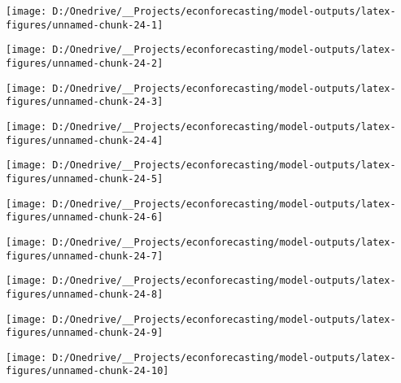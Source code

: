 \documentclass[11pt, letterpaper]{article}\usepackage[]{graphicx}\usepackage[]{color}
\begin{document}
{\centering \texttt{[image: D:/Onedrive/\_\_Projects/econforecasting/model-outputs/latex-figures/unnamed-chunk-24-1]} 

}




{\centering \texttt{[image: D:/Onedrive/\_\_Projects/econforecasting/model-outputs/latex-figures/unnamed-chunk-24-2]} 

}




{\centering \texttt{[image: D:/Onedrive/\_\_Projects/econforecasting/model-outputs/latex-figures/unnamed-chunk-24-3]} 

}




{\centering \texttt{[image: D:/Onedrive/\_\_Projects/econforecasting/model-outputs/latex-figures/unnamed-chunk-24-4]} 

}




{\centering \texttt{[image: D:/Onedrive/\_\_Projects/econforecasting/model-outputs/latex-figures/unnamed-chunk-24-5]} 

}




{\centering \texttt{[image: D:/Onedrive/\_\_Projects/econforecasting/model-outputs/latex-figures/unnamed-chunk-24-6]} 

}




{\centering \texttt{[image: D:/Onedrive/\_\_Projects/econforecasting/model-outputs/latex-figures/unnamed-chunk-24-7]} 

}




{\centering \texttt{[image: D:/Onedrive/\_\_Projects/econforecasting/model-outputs/latex-figures/unnamed-chunk-24-8]} 

}




{\centering \texttt{[image: D:/Onedrive/\_\_Projects/econforecasting/model-outputs/latex-figures/unnamed-chunk-24-9]} 

}




{\centering \texttt{[image: D:/Onedrive/\_\_Projects/econforecasting/model-outputs/latex-figures/unnamed-chunk-24-10]} 

}
\end{document}
